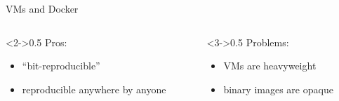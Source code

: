 \documentclass{beamer}
\begin{document}
\begin{frame}{VMs and Docker}


  \Large{
  \begin{columns}
    \begin{column}[t]<2->{0.5\textwidth}
      Pros:
      \begin{itemize}
      \item ``bit-reproducible''

      \item reproducible anywhere by anyone
      \end{itemize}
    \end{column}

    \begin{column}[t]<3->{0.5\textwidth}
      Problems:
      \begin{itemize}
      \item VMs are heavyweight


      \item binary images are opaque



\end{itemize}
\end{column}
\end{columns}}
\end{frame}
\end{document}
